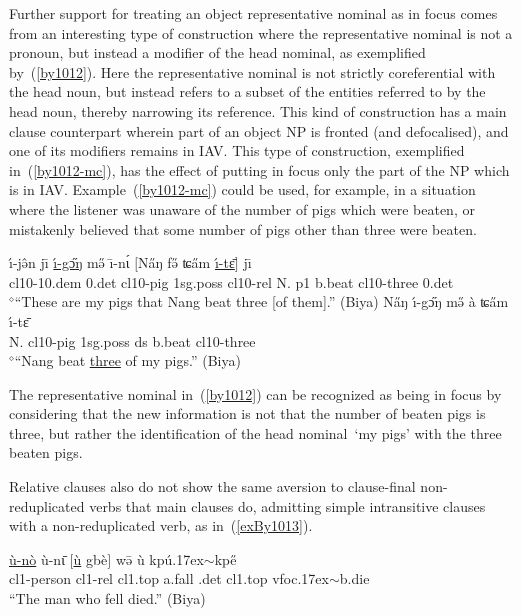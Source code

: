 \documentclass[10pt,twoside]{article}
\makeatletter
\newcommand{\gl}[1]{`#1'}
\newcommand{\cl}[1]{{\sc cl#1}}
\newcommand{\pref}[1]{(\ref{#1})}
\newcommand{\sref}[1]{Section \ref{#1}}
\def\elicited{$^\diamond$}
\def\til{\raise.17ex\hbox{$\scriptstyle\mathtt{\sim}$}}	%
\renewcommand{\i}{ı}
\def\@{ə}
\def\eh{ɛ}
\def\aw{ɔ}
\def\ih{ɩ}
\def\ng{ŋ}
\def\tch{ʨ}
\makeatother
\begin{document}
Further support for treating an object representative nominal as
in focus comes from an interesting type of construction where 
the representative nominal is not a pronoun, but instead
a modifier of the head nominal, as exemplified
by~\pref{by1012}.
Here the representative nominal
is not strictly coreferential with
the head noun, but instead refers to a subset of the entities referred to by
the head noun, thereby narrowing its reference. This kind
of construction has a main clause counterpart wherein part of
an object NP is fronted (and defocalised), and one of its modifiers remains in IAV.
This type of construction, exemplified in~\pref{by1012-mc}, has
the effect of putting in focus only the part of the NP which is in IAV.
Example~\pref{by1012-mc} could be used, for example, in a situation where
the listener was unaware of the number of pigs which were beaten, or mistakenly
believed that some number of pigs other than three were beaten.
%
\begin{exe}
\ex \label{by1012}
\gll \'\i-j\^{\@}n j\={\i} \uline{\'\i-g\H{\aw}{\ng}} m\H{\@} \=\i-n\'{\ih} $[$N\H{a}{\ng} f\H{\@} \tch\H{a}m \uline{\'\i-t\={\eh}}$]$ j\={\i}	\\
\cl10-{\sc 10.dem} {\sc \cl10.det} \cl10-pig {\sc 1sg.poss} \cl10-{\sc rel} N.
{\sc p1} b.beat \cl10-three {\sc \cl10.det} 	\\
\glt \elicited``These are my pigs that Nang beat three [of them].'' (Biya) %
\ex \label{by1012-mc}
\gll N\H{a}{\ng}  {\'\i-g\H{\aw}{\ng}} m\H{\@} \`a \tch\H{a}m \'\i-t\={\eh}	\\
N. \cl10-pig {\sc 1sg.poss} {\sc ds} b.beat \cl10-three	\\
\glt \elicited``Nang beat \uline{three} of my pigs.'' (Biya) %
\end{exe}
%

The representative nominal in~\pref{by1012} can be
recognized as being in focus
by considering that the
new information is not that the number of beaten pigs is three, but rather
the identification of the head nominal~\gl{my pigs} with the three
beaten pigs.

Relative clauses also do not show the same aversion to clause-final
non-reduplicated verbs that main clauses do, admitting simple
intransitive clauses with a non-reduplicated verb, as in~\pref{exBy1013}.
\begin{exe}
\ex	\label{exBy1013}
\gll \uline{\`u-n\`o} \`u-n\={\ih} $[$\uline{\`u} gb\`e$]$ w\={\@} \`u kp\'u\til{kp\H{e}}	\\
\cl1-person \cl1-{\sc rel} \cl1.{\sc top} a.fall {\sc \cl1.det} \cl1.{\sc top} {\sc vfoc}\til{b.die}	\\
\glt ``The man who fell died.'' (Biya)	%
\end{exe}
\end{document}
